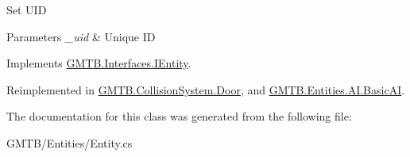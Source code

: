 Set U\+ID 


\begin{DoxyParams}{Parameters}
{\em \+\_\+uid} & Unique ID \\
\hline
\end{DoxyParams}


Implements \mbox{\hyperlink{interface_g_m_t_b_1_1_interfaces_1_1_i_entity}{G\+M\+T\+B.\+Interfaces.\+I\+Entity}}.



Reimplemented in \mbox{\hyperlink{class_g_m_t_b_1_1_collision_system_1_1_door_a31faede8cd554e4cfea2a012a1c4928e}{G\+M\+T\+B.\+Collision\+System.\+Door}}, and \mbox{\hyperlink{class_g_m_t_b_1_1_entities_1_1_a_i_1_1_basic_a_i_a848c08ffa4f9f575c970308a65144f52}{G\+M\+T\+B.\+Entities.\+A\+I.\+Basic\+AI}}.



The documentation for this class was generated from the following file\+:\begin{DoxyCompactItemize}
\item 
G\+M\+T\+B/\+Entities/Entity.\+cs\end{DoxyCompactItemize}

